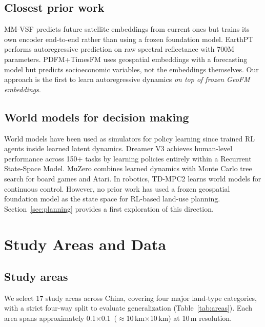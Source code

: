 \documentclass{article}
\begin{document}
\subsection{Closest prior work}

MM-VSF \citep{mmvsf2024} predicts future satellite embeddings from current ones but trains its own encoder end-to-end rather than using a frozen foundation model. EarthPT \citep{smith2023earthpt} performs autoregressive prediction on raw spectral reflectance with 700M parameters. PDFM+TimesFM \citep{google2024pdfm} uses geospatial embeddings with a forecasting model but predicts socioeconomic variables, not the embeddings themselves. Our approach is the first to learn autoregressive dynamics \textit{on top of frozen GeoFM embeddings}.

\subsection{World models for decision making}

World models have been used as simulators for policy learning since \citet{ha2018world} trained RL agents inside learned latent dynamics. Dreamer V3 \citep{hafner2023dreamerv3} achieves human-level performance across 150+ tasks by learning policies entirely within a Recurrent State-Space Model. MuZero \citep{schrittwieser2020muzero} combines learned dynamics with Monte Carlo tree search for board games and Atari. In robotics, TD-MPC2 \citep{hansen2024tdmpc2} learns world models for continuous control. However, no prior work has used a frozen geospatial foundation model as the state space for RL-based land-use planning. Section~\ref{sec:planning} provides a first exploration of this direction.


\section{Study Areas and Data}
\label{sec:data}

\subsection{Study areas}

We select 17 study areas across China, covering four major land-type categories, with a strict four-way split to evaluate generalization (Table~\ref{tab:areas}). Each area spans approximately 0.1\textdegree$\times$0.1\textdegree\ ($\approx$10\,km$\times$10\,km) at 10\,m resolution.
\end{document}
